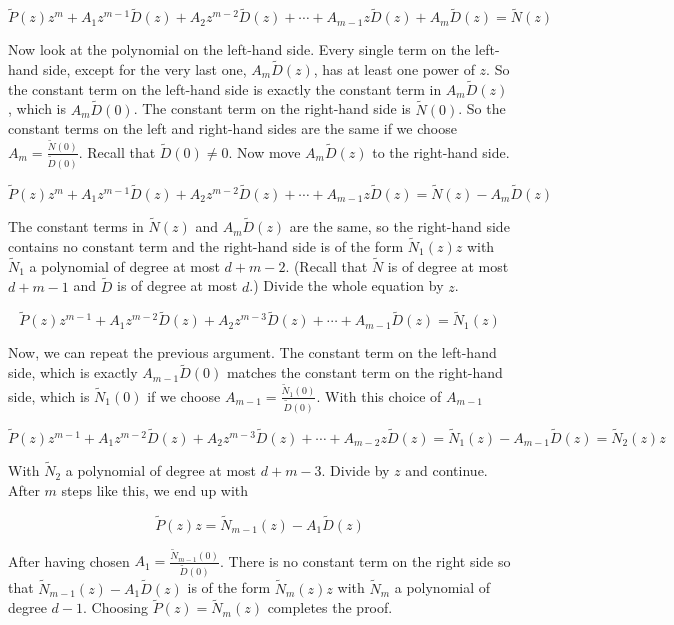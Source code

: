 \[
    \tilde{P}(z)z^m + A_1 z^{m-1} \tilde{D}(z) + A_2 z^{m-2} \tilde{D}(z) + \cdots + A_{m-1} z 
    \tilde{D}(z) + A_m \tilde{D}(z) = \tilde{N}(z)
\]

Now look at the polynomial on the left-hand side. Every single term on the left-hand side,
except for the very last one, \(A_m \tilde{D}(z)\), has at least one power of \(z\). So the constant 
term on the left-hand side is exactly the constant term in \(A_m \tilde{D}(z)\), which is 
\(A_m \tilde{D}(0)\). The constant term on the right-hand side is \(\tilde{N}(0)\). So the constant terms 
on the left and right-hand sides are the same if we choose \(A_m = \frac{\tilde{N}(0)}{\tilde{D}(0)}\). 
Recall that \(\tilde{D}(0) \neq 0\). Now move \(A_m \tilde{D}(z)\) to the right-hand side.

\[
    \tilde{P}(z)z^m + A_1 z^{m-1} \tilde{D}(z) + A_2 z^{m-2} \tilde{D}(z) + \cdots + A_{m-1} z 
    \tilde{D}(z) = \tilde{N}(z) - A_m \tilde{D}(z)
\]

The constant terms in \(\tilde{N}(z)\) and \(A_m \tilde{D}(z)\) are the same, so the right-hand side 
contains no constant term and the right-hand side is of the form \(\tilde{N}_1(z)z\) with \(\tilde{N}_1\) 
a polynomial of degree at most \(d + m - 2\). (Recall that \(\tilde{N}\) is of degree at most 
\(d + m - 1\) and \(\tilde{D}\) is of degree at most \(d\).) Divide the whole equation by \(z\).

\[
    \tilde{P}(z)z^{m-1} + A_1 z^{m-2} \tilde{D}(z) + A_2 z^{m-3} \tilde{D}(z) + \cdots + A_{m-1} 
    \tilde{D}(z) = \tilde{N}_1(z)
\]

Now, we can repeat the previous argument. The constant term on the left-hand side, which
is exactly \(A_{m-1} \tilde{D}(0)\) matches the constant term on the right-hand side, which is 
\(\tilde{N}_1(0)\) if we choose \(A_{m-1} = \frac{\tilde{N}_1(0)}{\tilde{D}(0)}\). With this choice of 
\(A_{m-1}\)

\[
    \tilde{P}(z)z^{m-1} + A_1 z^{m-2} \tilde{D}(z) + A_2 z^{m-3} \tilde{D}(z) + \cdots + A_{m-2} z 
    \tilde{D}(z) = \tilde{N}_1(z) - A_{m-1} \tilde{D}(z) = \tilde{N}_2(z)z
\]

With \(\tilde{N}_2\) a polynomial of degree at most \(d + m - 3\). Divide by \(z\) and continue. 
After \(m\) steps like this, we end up with

\[
    \tilde{P}(z)z = \tilde{N}_{m-1}(z) - A_1 \tilde{D}(z)
\]

After having chosen \(A_1 = \frac{\tilde{N}_{m-1}(0)}{\tilde{D}(0)}\). There is no constant term on the 
right side so that \(\tilde{N}_{m-1}(z) - A_1 \tilde{D}(z)\) is of the form \(\tilde{N}_m(z)z\) with 
\(\tilde{N}_m\) a polynomial of degree \(d - 1\). Choosing \(\tilde{P}(z) = \tilde{N}_m(z)\) completes 
the proof.

